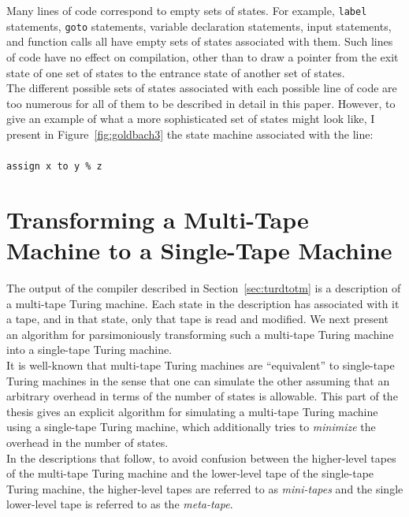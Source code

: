 Many lines of code correspond to empty sets of states. For example, \texttt{label} statements, \texttt{goto} statements, variable declaration statements, input statements, and function calls all have empty sets of states associated with them. Such lines of code have no effect on compilation, other than to draw a pointer from the exit state of one set of states to the entrance state of another set of states. \\

The different possible sets of states associated with each possible line of code are too numerous for all of them to be described in detail in this paper. However, to give an example of what a more sophisticated set of states might look like, I present in Figure~\ref{fig:goldbach3} the state machine associated with the line: \\ \\
\texttt{assign x to y \% z} \\

\section{Transforming a Multi-Tape Machine to a Single-Tape Machine \label{sec:mttost}}

The output of the compiler described in Section~\ref{sec:turdtotm} is a description of a multi-tape Turing machine. Each state in the description has associated with it a tape, and in that state, only that tape is read and modified. We next present an algorithm for parsimoniously transforming such a multi-tape Turing machine into a single-tape Turing machine. \\

It is well-known that multi-tape Turing machines are ``equivalent'' to single-tape Turing machines in the sense that one can simulate the other assuming that an arbitrary overhead in terms of the number of states is allowable. This part of the thesis gives an explicit algorithm for simulating a multi-tape Turing machine using a single-tape Turing machine, which additionally tries to \emph{minimize} the overhead in the number of states. \\

In the descriptions that follow, to avoid confusion between the higher-level tapes of the multi-tape Turing machine and the lower-level tape of the single-tape Turing machine, the higher-level tapes are referred to as \emph{mini-tapes} and the single lower-level tape is referred to as the \emph{meta-tape}. \\

